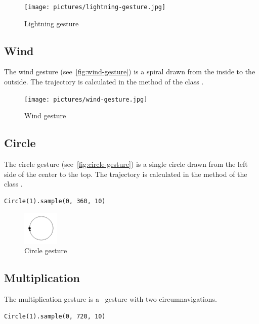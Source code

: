 \begin{figure}[!ht]
    \texttt{[image: pictures/lightning-gesture.jpg]}
    \caption{Lightning gesture}
    \label{fig:lightning-gesture}
\end{figure}


\subsection{Wind}
The wind gesture (see~\autoref{fig:wind-gesture}) is a spiral drawn from the inside to the outside.
The trajectory is calculated in the method  of the class .

\begin{figure}[!ht]
    \texttt{[image: pictures/wind-gesture.jpg]}
    \caption{Wind gesture}
    \label{fig:wind-gesture}
\end{figure}


\subsection{Circle}\label{subsec:circle}
The circle gesture (see~\autoref{fig:circle-gesture}) is a single circle drawn from the left side of the center to the top.
The trajectory is calculated in the method  of the class .

\begin{lstlisting}
Circle(1).sample(0, 360, 10)
\end{lstlisting}

\begin{figure}[!ht]
    \centering
    \includegraphics[width=0.15\textwidth]{pictures/circle-gesture.png}
    \caption{Circle gesture}
    \label{fig:circle-gesture}
\end{figure}


\subsection{Multiplication}
The multiplication gesture is a~ gesture with two circumnavigations.

\begin{lstlisting}
Circle(1).sample(0, 720, 10)
\end{lstlisting}


